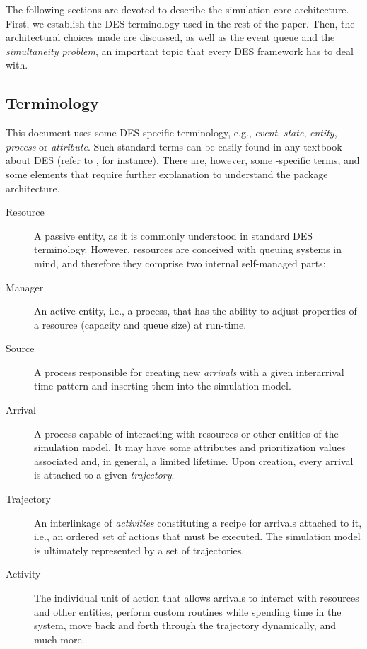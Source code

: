 \documentclass[
  nojss]{jss}
\providecommand{\tightlist}{%
  \setlength{\itemsep}{0pt}\setlength{\parskip}{0pt}}
\begin{document}
The following sections are devoted to describe the simulation core
architecture. First, we establish the DES terminology used in the rest
of the paper. Then, the architectural choices made are discussed, as
well as the event queue and the \emph{simultaneity problem}, an
important topic that every DES framework has to deal with.

\subsection{Terminology}\label{terminology}

This document uses some DES-specific terminology, e.g., \emph{event},
\emph{state}, \emph{entity}, \emph{process} or \emph{attribute}. Such
standard terms can be easily found in any textbook about DES (refer to
\citet{Banks:2005:Discrete}, for instance). There are, however, some
-specific terms, and some elements that require further
explanation to understand the package architecture.

\begin{description}
\item[Resource]
A passive entity, as it is commonly understood in standard DES
terminology. However,  resources are conceived with queuing
systems in mind, and therefore they comprise two internal self-managed
parts:

\item[Manager]
An active entity, i.e., a process, that has the ability to adjust
properties of a resource (capacity and queue size) at run-time.
\item[Source]
A process responsible for creating new \emph{arrivals} with a given
interarrival time pattern and inserting them into the simulation model.
\item[Arrival]
A process capable of interacting with resources or other entities of the
simulation model. It may have some attributes and prioritization values
associated and, in general, a limited lifetime. Upon creation, every
arrival is attached to a given \emph{trajectory}.
\item[Trajectory]
An interlinkage of \emph{activities} constituting a recipe for arrivals
attached to it, i.e., an ordered set of actions that must be executed.
The simulation model is ultimately represented by a set of trajectories.
\item[Activity]
The individual unit of action that allows arrivals to interact with
resources and other entities, perform custom routines while spending
time in the system, move back and forth through the trajectory
dynamically, and much more.
\end{description}
\end{document}
